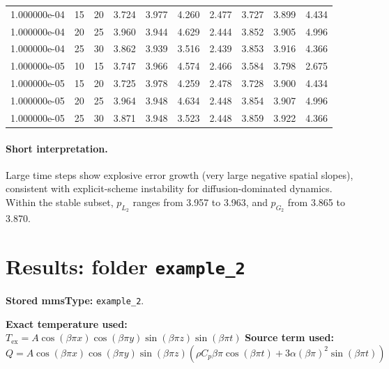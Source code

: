 \documentclass[11pt,a4paper]{article}
\begin{document}
\begin{table}[htbp]
{\begin{tabular}{cccccccccc}
1.000000e-04 & 15 & 20 & 3.724 & 3.977 & 4.260 & 2.477 & 3.727 & 3.899 & 4.434 \\
1.000000e-04 & 20 & 25 & 3.960 & 3.944 & 4.629 & 2.444 & 3.852 & 3.905 & 4.996 \\
1.000000e-04 & 25 & 30 & 3.862 & 3.939 & 3.516 & 2.439 & 3.853 & 3.916 & 4.366 \\
1.000000e-05 & 10 & 15 & 3.747 & 3.966 & 4.574 & 2.466 & 3.584 & 3.798 & 2.675 \\
1.000000e-05 & 15 & 20 & 3.725 & 3.978 & 4.259 & 2.478 & 3.728 & 3.900 & 4.434 \\
1.000000e-05 & 20 & 25 & 3.964 & 3.948 & 4.634 & 2.448 & 3.854 & 3.907 & 4.996 \\
1.000000e-05 & 25 & 30 & 3.871 & 3.948 & 3.523 & 2.448 & 3.859 & 3.922 & 4.366 \\
\bottomrule
\end{tabular}%
}
\end{table}
\paragraph{Short interpretation.}
Large time steps show explosive error growth (very large negative spatial slopes), consistent with explicit-scheme instability for diffusion-dominated dynamics. Within the stable subset, $p_{L_2}$ ranges from 3.957 to 3.963, and $p_{G_2}$ from 3.865 to 3.870.
\section{Results: folder \texttt{example\_2}}
\textbf{Stored mmsType:} \texttt{example\_2}.

\textbf{Exact temperature used:} $T_{\mathrm{ex}} = A\cos(\beta\pi x)\cos(\beta\pi y)\sin(\beta\pi z)\sin(\beta\pi t)$
\textbf{Source term used:} $Q = A\cos(\beta\pi x)\cos(\beta\pi y)\sin(\beta\pi z)\left(\rho C_p\beta\pi\cos(\beta\pi t) + 3\alpha(\beta\pi)^2\sin(\beta\pi t)\right)$
\end{document}
